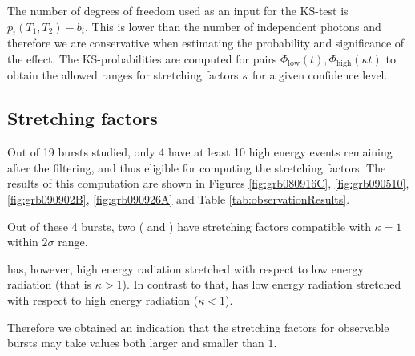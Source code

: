 \documentclass[manuscript]{aastex}
\begin{document}
The number of degrees of freedom used as an input for the KS-test is
$p_i\left(T_1, T_2\right) - b_i$. This is lower than the number of
independent photons and therefore we are conservative when estimating
the probability and significance of the effect. The KS-probabilities
are computed for pairs $\Phi_\text{low}\left(t\right),
\Phi_\text{high}\left(\kappa t\right)$ to obtain the allowed ranges
for stretching factors $\kappa$ for a given confidence level.

\subsection{Stretching factors}

Out of 19 bursts studied, only 4 have at least 10 high energy events
remaining after the filtering, and thus eligible for computing the
stretching factors. The results of this computation are shown in
Figures \ref{fig:grb080916C}, \ref{fig:grb090510},
\ref{fig:grb090902B}, \ref{fig:grb090926A} and Table
\ref{tab:observationResults}.

Out of these 4 bursts, two ( and ) have
stretching factors compatible with $\kappa = 1$ within $2\sigma$
range.

 has, however, high energy radiation stretched with respect
to low energy radiation (that is $\kappa > 1$). In contrast to that,
 has low energy radiation stretched with respect to high
energy radiation ($\kappa < 1$).

Therefore we obtained an indication that the stretching factors for
observable bursts may take values both larger and smaller than $1$.
\end{document}
